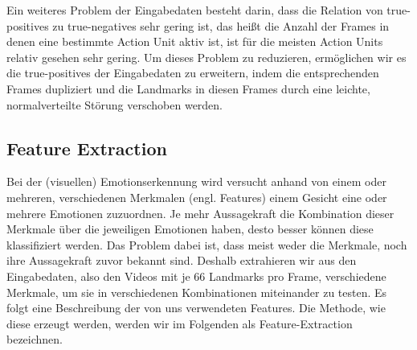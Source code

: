 Ein weiteres Problem der Eingabedaten besteht darin, dass die Relation von true-positives zu true-negatives sehr gering ist, das heißt die Anzahl der Frames
in denen eine bestimmte Action Unit aktiv ist, ist für die meisten Action Units relativ gesehen sehr gering.\newline
Um dieses Problem zu reduzieren, ermöglichen wir es die true-positives der Eingabedaten zu erweitern, indem die entsprechenden Frames dupliziert
und die Landmarks in diesen Frames durch eine leichte, normalverteilte Störung verschoben werden.


\subsection{Feature Extraction}
Bei der (visuellen) Emotionserkennung wird versucht anhand von einem oder mehreren, verschiedenen Merkmalen (engl. Features)
einem Gesicht eine oder mehrere Emotionen zuzuordnen. Je mehr Aussagekraft die Kombination dieser Merkmale über die jeweiligen Emotionen haben,
desto besser können diese klassifiziert werden. Das Problem dabei ist, dass meist weder die Merkmale, noch
ihre Aussagekraft zuvor bekannt sind. Deshalb extrahieren wir aus den Eingabedaten, also den Videos mit je 66 Landmarks pro
Frame, verschiedene Merkmale, um sie in verschiedenen Kombinationen miteinander zu testen. Es folgt eine Beschreibung
der von uns verwendeten Features. Die Methode, wie diese erzeugt werden, werden wir im Folgenden als Feature-Extraction bezeichnen.


